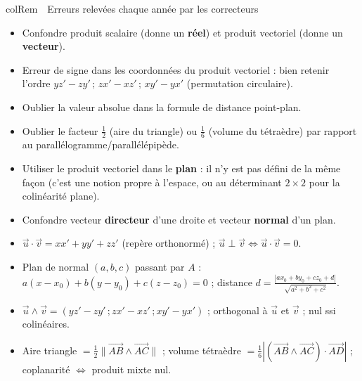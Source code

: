 \documentclass[11pt,a4paper]{article}
\newenvironment{remarque}[1][Remarque]
  {\begin{fiche}{colRem}{\ding{43}~~#1}}{\end{fiche}}
\begin{document}
\begin{remarque}[Erreurs relevées chaque année par les correcteurs]
\begin{itemize}[leftmargin=6mm, itemsep=0.5mm]
  \item Confondre produit scalaire (donne un \textbf{réel}) et produit vectoriel (donne un \textbf{vecteur}).
  \item Erreur de signe dans les coordonnées du produit vectoriel : bien retenir l'ordre $yz'-zy'\,;\,zx'-xz'\,;\,xy'-yx'$ (permutation circulaire).
  \item Oublier la valeur absolue dans la formule de distance point-plan.
  \item Oublier le facteur $\frac12$ (aire du triangle) ou $\frac16$ (volume du tétraèdre) par rapport au parallélogramme/parallélépipède.
  \item Utiliser le produit vectoriel dans le \textbf{plan} : il n'y est pas défini de la même façon (c'est une notion propre à l'espace, ou au déterminant $2\times2$ pour la colinéarité plane).
  \item Confondre vecteur \textbf{directeur} d'une droite et vecteur \textbf{normal} d'un plan.
\end{itemize}
\end{remarque}

\vspace{4mm}
\begin{tcolorbox}[
  enhanced, boxrule=0pt, arc=2mm,
  interior style={left color=qtealdark, right color=qteal},
  left=6mm, right=6mm, top=4mm, bottom=4mm,
  fontupper=\color{white}\sffamily,
  title={\sffamily\bfseries\color{white}\ding{72}~~À retenir},
  colbacktitle=qtealdark, coltitle=white, boxrule=0pt
]
\begin{itemize}[leftmargin=6mm, label={\color{qamber}}, itemsep=1mm]
  \item $\vec u\cdot\vec v=xx'+yy'+zz'$ (repère orthonormé) ; $\vec u\perp\vec v\iff\vec u\cdot\vec v=0$.
  \item Plan de normal $(a,b,c)$ passant par $A$ : $a(x-x_0)+b(y-y_0)+c(z-z_0)=0$ ; distance $d=\frac{|ax_0+by_0+cz_0+d|}{\sqrt{a^2+b^2+c^2}}$.
  \item $\vec u\wedge\vec v=(yz'-zy'\,;zx'-xz'\,;xy'-yx')$ ; orthogonal à $\vec u$ et $\vec v$ ; nul ssi colinéaires.
  \item Aire triangle $=\frac12\|\overrightarrow{AB}\wedge\overrightarrow{AC}\|$ ; volume tétraèdre $=\frac16|(\overrightarrow{AB}\wedge\overrightarrow{AC})\cdot\overrightarrow{AD}|$ ; coplanarité $\iff$ produit mixte nul.
\end{itemize}
\end{tcolorbox}
\end{document}
